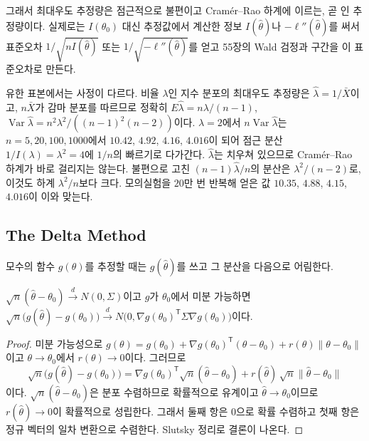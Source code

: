 그래서 최대우도 추정량은 점근적으로 불편이고 Cramér--Rao 하계에 이르는, 곧 인 추정량이다. 실제로는 $I(\theta_0)$ 대신 추정값에서 계산한 정보 $I(\hat\theta)$나  $-\ell''(\hat\theta)$를 써서 표준오차 $1/\sqrt{nI(\hat\theta)}$ 또는 $1/\sqrt{-\ell''(\hat\theta)}$를 얻고 55장의 Wald 검정과 구간을 이 표준오차로 만든다.

유한 표본에서는 사정이 다르다. 비율 $\lambda$인 지수 분포의 최대우도 추정량은 $\hat\lambda=1/\bar X$이고, $n\bar X$가 감마 분포를 따르므로 정확히 $E\hat\lambda=n\lambda/(n-1)$, $\operatorname{Var}\hat\lambda=n^2\lambda^2/((n-1)^2(n-2))$이다. $\lambda=2$에서 $n\operatorname{Var}\hat\lambda$는 $n=5,20,100,1000$에서 $10.42$, $4.92$, $4.16$, $4.016$이 되어 점근 분산 $1/I(\lambda)=\lambda^2=4$에 $1/n$의 빠르기로 다가간다. $\hat\lambda$는 치우쳐 있으므로 Cramér--Rao 하계가 바로 걸리지는 않는다. 불편으로 고친 $(n-1)\hat\lambda/n$의 분산은 $\lambda^2/(n-2)$로, 이것도 하계 $\lambda^2/n$보다 크다. 모의실험을 $20$만 번 반복해 얻은 값 $10.35$, $4.88$, $4.15$, $4.016$이 이와 맞는다.

\subsection{The Delta Method}

모수의 함수 $g(\theta)$를 추정할 때는 $g(\hat\theta)$를 쓰고 그 분산을 다음으로 어림한다.

\begin{proposition}[델타 방법]
\label{prop:delta-method}
$\sqrt n(\hat\theta-\theta_0)\xrightarrow{d}N(0,\Sigma)$이고 $g$가 $\theta_0$에서 미분 가능하면 $\sqrt n\bigl(g(\hat\theta)-g(\theta_0)\bigr)\xrightarrow{d}N\bigl(0,\nabla g(\theta_0)^{\mathsf T}\Sigma\nabla g(\theta_0)\bigr)$이다.
\end{proposition}

\begin{proof}
미분 가능성으로 $g(\theta)=g(\theta_0)+\nabla g(\theta_0)^{\mathsf T}(\theta-\theta_0)+r(\theta)\|\theta-\theta_0\|$이고 $\theta\to\theta_0$에서 $r(\theta)\to0$이다. 그러므로
\[
\sqrt n\bigl(g(\hat\theta)-g(\theta_0)\bigr)=\nabla g(\theta_0)^{\mathsf T}\sqrt n(\hat\theta-\theta_0)+r(\hat\theta)\,\sqrt n\|\hat\theta-\theta_0\|
\]
이다. $\sqrt n(\hat\theta-\theta_0)$은 분포 수렴하므로 확률적으로 유계이고 $\hat\theta\to\theta_0$이므로 $r(\hat\theta)\to0$이 확률적으로 성립한다. 그래서 둘째 항은 $0$으로 확률 수렴하고 첫째 항은 정규 벡터의 일차 변환으로 수렴한다. Slutsky 정리로 결론이 나온다.
\end{proof}

